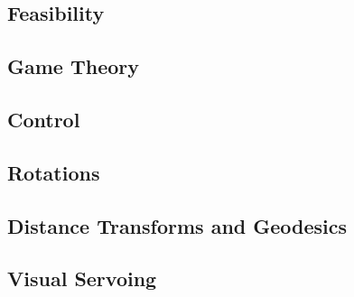 \subsection{Feasibility}

\subsection{Game Theory}

\subsection{Control}

\subsection{Rotations}

\subsection{Distance Transforms and Geodesics}

\subsection{Visual Servoing}
